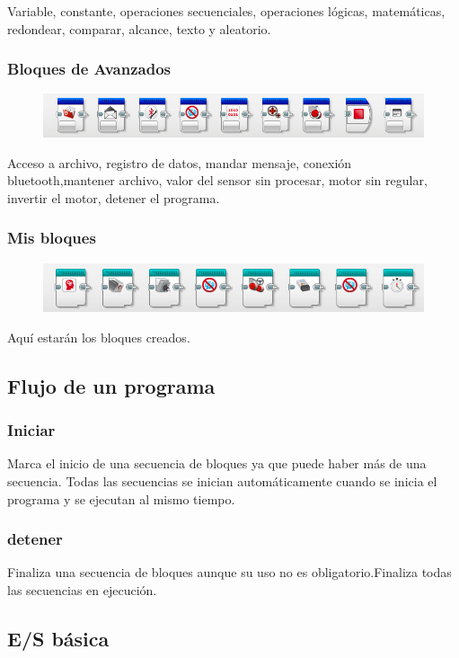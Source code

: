 \documentclass[12pt,a4paper]{article}
\begin{document}
Variable, constante, operaciones secuenciales, operaciones lógicas, matemáticas,
redondear, comparar, alcance, texto y aleatorio.

\subsubsection{Bloques de Avanzados}

\begin{figure}[H]
	\includegraphics[scale=0.8]{avanzado.PNG}
	\centering
\end{figure}

Acceso a archivo, registro de datos, mandar mensaje, conexión bluetooth,mantener
archivo, valor del sensor sin procesar, motor sin regular, invertir el motor,
detener el programa.

\subsubsection{Mis bloques}

\begin{figure}[H]
	\includegraphics[scale=0.8]{BloquesPersonalizados.PNG}
	\centering
\end{figure}

Aquí estarán los bloques creados.

\subsection{Flujo de un programa}

\subsubsection{Iniciar}

Marca el inicio de una secuencia de bloques ya que puede haber más de una
secuencia. Todas las secuencias se inician automáticamente cuando se inicia el
programa y se ejecutan al mismo tiempo.

\subsubsection{detener}

Finaliza una secuencia de bloques aunque su uso no es obligatorio.Finaliza todas
las secuencias en ejecución.

\subsection{E/S básica}
\end{document}
